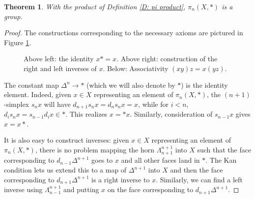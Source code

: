 \documentclass[12pt]{article}
\theoremstyle{plain}
\newtheorem{theorem}{Theorem}[section]
\theoremstyle{definition}
\begin{document}
\begin{theorem}
With the product of Definition \ref{D: pi product}, $\pi_n(X,*)$ is a group. 
\end{theorem}
\begin{proof}
The constructions corresponding to the necessary axioms are pictured in Figure \ref{F: fig27}.


\begin{figure}[!htp]
\begin{center}
\end{center}
\caption{Above left: the identity $x*=x$. Above right: construction of the right and left inverses of $x$. Below: Associativity $(xy)z=x(yz)$.}\label{F: fig27}
\end{figure}

The constant map $\Delta^n\to *$ (which we will also denote by $*$) is the identity element. Indeed, given $x\in X$ representing an element of $\pi_n(X,*)$, the $(n+1)$-simplex $s_{n}x$ will have $d_{n+1}s_nx=d_ns_nx=x$, while for $i<n$, $d_is_nx=s_{n-1}d_ix\in *$. This realizes $x=*x$. Similarly, consideration of $s_{n-1}x$  gives $x=x*$. 


It is also easy to construct inverses:  given $x\in X$ representing an element of $\pi_n(X,*)$, there is no problem mapping the horn $\Lambda^{n+1}_{n+1}$ into $X$ such that the face corresponding to $d_{n-1}\Delta^{n+1}$ goes to $x$ and all other faces land in $*$. The Kan condition lets us extend this to a map of $\Delta^{n+1}$ into $X$ and then the face corresponding to $d_{n+1}\Delta^{n+1}$ is a right inverse to $x$. Similarly, we can find a left inverse using $\Lambda^{n+1}_{n-1}$ and putting $x$ on the face corresponding to $d_{n+1}\Delta^{n+1}$. 


\end{proof}
\end{document}
